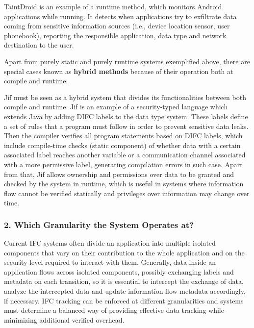 TaintDroid \cite{taintdroid} is an example of a runtime method, which monitors Android applications while running. It detects when applications try to exfiltrate data coming from sensitive information sources (i.e., device location sensor, user phonebook), reporting the responsible application, data type and network destination to the user.

Apart from purely static and purely runtime systems exemplified above, there are special cases known as \textbf{hybrid methods} because of their operation both at compile and runtime.

Jif \cite{jif} must be seen as a hybrid system that divides its functionalities between both compile and runtime. Jif is an example of a security-typed language which extends Java by adding DIFC labels to the data type system. These labels define a set of rules that a program must follow in order to prevent sensitive data leaks. Then the compiler verifies all program statements based on DIFC labels, which include compile-time checks (static component) of whether data with a certain associated label reaches another variable or a communication channel associated with a more permissive label, generating compilation errors in such case. Apart from that, Jif allows ownership and permissions over data to be granted and checked by the system in runtime, which is useful in systems where information flow cannot be verified statically and privileges over information may change over time.

\subsubsection{2. Which Granularity the System Operates at?}

Current IFC systems often divide an application into multiple isolated components that vary on their contribution to the whole application and on the security-level required to interact with them. Generally, data inside an application flows across isolated components, possibly exchanging labels and metadata on each transition, so it is essential to intercept the exchange of data, analyze the intercepted data and update information flow metadata accordingly, if necessary. IFC tracking can be enforced at different granularities and systems must determine a balanced way of providing effective data tracking while minimizing additional verified overhead.

